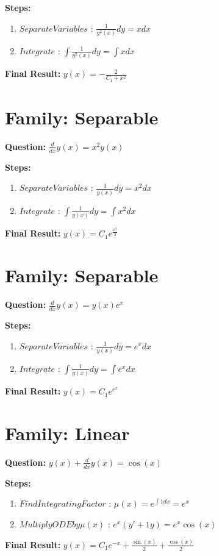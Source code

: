\documentclass{article}
\begin{document}
\textbf{Steps:}
\begin{enumerate}
\item $Separate Variables$ :  $\frac{1}{y^{2}{\left(x \right)}} dy = x dx$
\item $Integrate$ :  $\int \frac{1}{y^{2}{\left(x \right)}} dy = \int x dx$
\end{enumerate}
\textbf{Final Result:} $y{\left(x \right)} = - \frac{2}{C_{1} + x^{2}}$

\section*{Family: Separable}
\textbf{Question:} $\frac{d}{d x} y{\left(x \right)} = x^{2} y{\left(x \right)}$

\textbf{Steps:}
\begin{enumerate}
\item $Separate Variables$ :  $\frac{1}{y{\left(x \right)}} dy = x^{2} dx$
\item $Integrate$ :  $\int \frac{1}{y{\left(x \right)}} dy = \int x^{2} dx$
\end{enumerate}
\textbf{Final Result:} $y{\left(x \right)} = C_{1} e^{\frac{x^{3}}{3}}$

\section*{Family: Separable}
\textbf{Question:} $\frac{d}{d x} y{\left(x \right)} = y{\left(x \right)} e^{x}$

\textbf{Steps:}
\begin{enumerate}
\item $Separate Variables$ :  $\frac{1}{y{\left(x \right)}} dy = e^{x} dx$
\item $Integrate$ :  $\int \frac{1}{y{\left(x \right)}} dy = \int e^{x} dx$
\end{enumerate}
\textbf{Final Result:} $y{\left(x \right)} = C_{1} e^{e^{x}}$

\section*{Family: Linear}
\textbf{Question:} $y{\left(x \right)} + \frac{d}{d x} y{\left(x \right)} = \cos{\left(x \right)}$

\textbf{Steps:}
\begin{enumerate}
\item $Find Integrating Factor$ :  $\mu(x) = e^{\int 1 dx} = e^{x}$
\item $Multiply ODE by \mu(x)$ :  $e^{x}(y' + 1y) = e^{x} \cos{\left(x \right)}$
\end{enumerate}
\textbf{Final Result:} $y{\left(x \right)} = C_{1} e^{- x} + \frac{\sin{\left(x \right)}}{2} + \frac{\cos{\left(x \right)}}{2}$
\end{document}
